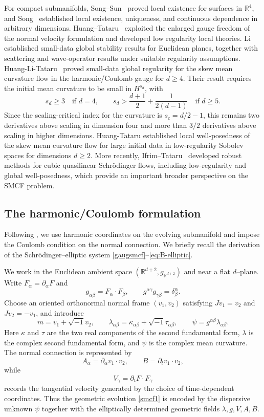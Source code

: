 \documentclass[11pt,letterpaper,reqno]{amsart}
\numberwithin{equation}{section}
\newcommand{\R}{\mathbb R}
\theoremstyle{definition}
\theoremstyle{remark}
\begin{document}
 
For compact submanifolds, Song--Sun~\cite{SS19} proved local existence
for surfaces in $\mathbb R^4$, and Song~\cite{So21} established local
existence, uniqueness, and continuous dependence in arbitrary
dimensions. Huang--Tataru~\cite{HT22, HT221} exploited the enlarged
gauge freedom of the normal velocity formulation and developed low regularity
local theories.   Li~\cite{Liz21,Liz22} established small-data global stability results for
Euclidean planes, together with scattering and wave-operator results under suitable
regularity assumptions. Huang-Li-Tataru~\cite{HLT24} proved small-data global regularity for the skew mean curvature flow in the harmonic/Coulomb gauge for \(d\ge4\). Their result requires the initial mean curvature to be small in \(H^{s_d}\), with
    \begin{equation}\label{sd}
 s_d\ge3 \quad\text{if }d=4, \qquad s_d> \frac{d+1}{2}+\frac{1}{2(d-1)} \quad\text{if }d\ge5.
\end{equation}
Since the scaling-critical index for the curvature is \(s_c=d/2-1\), this remains two derivatives above scaling in dimension four and more than \(3/2\) derivatives above scaling in higher dimensions. Huang-Tataru \cite{HT25} established local well-posedness of the skew mean curvature flow for large initial data in low-regularity Sobolev spaces for dimensions \(d \geq 2\). More recently, Ifrim--Tataru~\cite{IfT25, IfT24} developed robust methods
for cubic quasilinear Schr\"odinger flows, including low-regularity and global
well-posedness, which provide an important broader perspective on the SMCF problem.    


\subsection{The harmonic/Coulomb formulation}
Following \cite{HT22,HLT24}, we use harmonic coordinates on the
evolving submanifold and impose the Coulomb condition on the normal
connection. We briefly recall the derivation of the
Schr\"odinger--elliptic system
\eqref{gaugsmcf}--\eqref{eq:B-elliptic}.

 We  work in the Euclidean ambient space $(\R^{d+2},g_{\R^{d+2}})$ and near a
flat $d$--plane.  Write $F_\alpha=\partial_\alpha F$ and
\[
 g_{\alpha\beta}=F_\alpha\cdot F_\beta,\qquad
 g^{\alpha\gamma}g_{\gamma\beta}=\delta^\alpha_\beta.
\]
Choose an oriented orthonormal normal frame $(v_1,v_2)$ satisfying
$Jv_1=v_2$ and $Jv_2=-v_1$, and introduce
\[
 m=v_1+\sqrt{-1} v_2,\qquad
 \lambda_{\alpha\beta}=\kappa_{\alpha\beta}+\sqrt{-1}\tau_{\alpha\beta},
 \qquad
 \psi=g^{\alpha\beta}\lambda_{\alpha\beta}.
\]
Here $\kappa$ and $\tau$ are the two real components of the second fundamental
form, $\lambda$ is the complex second fundamental form, and $\psi$ is the complex
mean curvature.  The normal connection is represented by
\[
 A_\alpha=\partial_\alpha v_1\cdot v_2,\qquad
 B=\partial_tv_1\cdot v_2,
\]
while
\[
 V_\gamma=\partial_tF\cdot F_\gamma
\]
records the tangential velocity generated by the choice of time-dependent
coordinates.  Thus the geometric evolution \eqref{smcf1} is encoded by the dispersive unknown
$\psi$ together with the elliptically determined geometric fields
$\lambda,g,V,A,B$.
 
\end{document}
